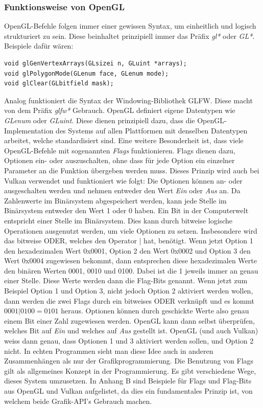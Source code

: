 \documentclass[titlepage, 11pt, a4paper, ngerman]{article}
\begin{document}
\subsubsection{Funktionsweise von OpenGL}
\acrshort{OpenGL}-Befehle folgen immer einer gewissen Syntax, um einheitlich und logisch strukturiert zu sein. Diese beinhaltet prinzipiell immer das Präfix \textit{gl*} oder \textit{GL*}. Beispiele dafür wären:
\begin{verbatim}
void glGenVertexArrays(GLsizei n, GLuint *arrays);
void glPolygonMode(GLenum face, GLenum mode);
void glClear(GLbitfield mask);
\end{verbatim}
\bigbreak
Analog funktioniert die Syntax der Windowing-Bibliothek \acrshort{GLFW}. Diese macht von dem Präfix \textit{glfw*} Gebrauch. \acrshort{OpenGL} definiert eigene Datentypen wie \textit{GLenum} oder \textit{GLuint}. Diese dienen prinzipiell dazu, dass die \acrshort{OpenGL}-Implementation des Systems auf allen Plattformen mit denselben Datentypen arbeitet, welche standardisiert sind. Eine weitere Besonderheit ist, dass viele \acrshort{OpenGL}-Befehle mit sogenannten \textit{Flags} funktionieren. Flags dienen dazu, Optionen ein- oder auszuschalten, ohne dass für jede Option ein einzelner Parameter an die Funktion übergeben werden muss. Dieses Prinzip wird auch bei Vulkan verwendet und funktioniert wie folgt: Die Optionen können an- oder ausgeschalten werden und nehmen entweder den Wert \textit{Ein} oder \textit{Aus} an. Da Zahlenwerte im Binärsystem abgespeichert werden, kann jede Stelle im Binärsystem entweder den Wert 1 oder 0 haben. Ein Bit in der Computerwelt entspricht einer Stelle im Binärsystem. Dies kann durch bitweise logische Operationen ausgenutzt werden, um viele Optionen zu setzen. Insbesondere wird das bitweise ODER, welches den Operator $|$ hat, benötigt. Wenn jetzt Option 1 den hexadezimalen Wert 0x0001, Option 2 den Wert 0x0002 und Option 3 den Wert 0x0004 zugewiesen bekommt, dann entsprechen diese hexadezimalen Werte den binären Werten 0001, 0010 und 0100. Dabei ist die 1 jeweils immer an genau einer Stelle. Diese Werte werden dann die Flag-Bits genannt. Wenn jetzt zum Beispiel Option 1 und Option 3, nicht jedoch Option 2 aktiviert werden wollen, dann werden die zwei Flags durch ein bitweises ODER verknüpft und es kommt $0001 | 0100 = 0101$ heraus. Optionen können durch geschickte Werte also genau einem Bit einer Zahl zugewiesen werden. \acrshort{OpenGL} kann dann selbst überprüfen, welches Bit auf \textit{Ein} und welches auf \textit{Aus} gestellt ist. \acrshort{OpenGL} (und auch Vulkan) weiss dann genau, dass Optionen 1 und 3 aktiviert werden sollen, und Option 2 nicht. In echten Programmen sieht man diese Idee auch in anderen Zusammenhängen als nur der Grafikprogrammierung. Die Benutzung von Flags gilt als allgemeines Konzept in der Programmierung. Es gibt verschiedene Wege, dieses System umzusetzen. In Anhang B sind Beispiele für Flags und Flag-Bits aus \acrshort{OpenGL} und Vulkan aufgelistet, da dies ein fundamentales Prinzip ist, von welchem beide Grafik-\acrshort{API}'s Gebrauch machen.\par
\end{document}
